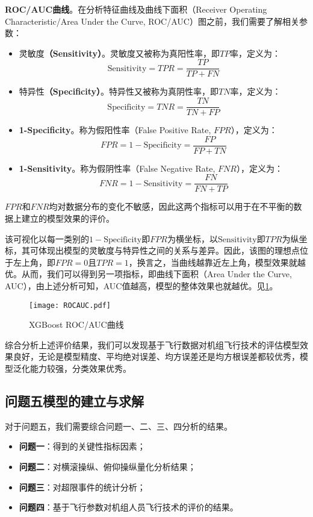 \documentclass{MathorCupModeling}
\begin{document}
\textbf{ROC/AUC曲线}。在分析特征曲线及曲线下面积（Receiver Operating Characteristic/Area Under the Curve, ROC/AUC）图之前，我们需要了解相关参数：
		\begin{itemize}
			\item {\heiti 灵敏度}\textbf{（Sensitivity）}。灵敏度又被称为真阳性率，即$TP$率，定义为：
			\begin{equation}
				\mathrm{Sensitivity}=TPR=\frac{TP}{TP+FN} \label{Sensitivity}
			\end{equation}
			\item {\heiti 特异性}\textbf{（Specificity）}。特异性又被称为真阴性率，即$TN$率，定义为：
			\begin{equation}
				\mathrm{Specificity}=TNR=\frac{TN}{TN+FP} \label{Specificity}
			\end{equation}
			\item \textbf{1-Specificity}。称为假阳性率（False Positive Rate, $FPR$），定义为：
			\begin{equation}
				FPR=1-\mathrm{Specificity}=\frac{FP}{FP+TN} \label{FPR}
			\end{equation}
			\item \textbf{1-Sensitivity}。称为假阴性率（False Negative Rate, $FNR$），定义为：
			\begin{equation}
				FNR=1-\mathrm{Sensitivity}=\frac{FN}{FN+TP} \label{FNR}
			\end{equation}
		\end{itemize}
		$FPR$和$FNR$均对数据分布的变化不敏感\textcolor{blue}{\cite{Paper:ROCAUC}}，因此这两个指标可以用于在不平衡的数据上建立的模型效果的评价。
		
该可视化以每一类别的$1-\mathrm{Specificity}$即$FPR$为横坐标，以$\mathrm{Sensitivity}$即$TPR$为纵坐标，其可体现出模型的灵敏度与特异性之间的关系与差异。因此，该图的理想点位于左上角，即$FPR=0$且$TPR=1$，换言之，当曲线越靠近左上角，模型效果就越优。从而，我们可以得到另一项指标，即曲线下面积（Area Under the Curve, AUC），由上述分析可知，AUC值越高，模型的整体效果也就越优。见\textcolor{blue}{\cref{fig:ROCAUC}}。
		\begin{figure}[H]
			\centering
			\texttt{[image: ROCAUC.pdf]}
			\caption{XGBoost ROC/AUC曲线}
			\label{fig:ROCAUC}
		\end{figure}

综合分析上述评价结果，我们可以发现基于飞行数据对机组飞行技术的评估模型效果良好，无论是模型精度、平均绝对误差、均方误差还是均方根误差都较优秀，模型泛化能力较强，分类效果优秀。
  
	\subsection{问题五模型的建立与求解}
对于问题五，我们需要综合问题一、二、三、四分析的结果。
\begin{itemize}
	\item \textbf{问题一}：得到的关键性指标因素；
	\item \textbf{问题二}：对横滚操纵、俯仰操纵量化分析结果；
	\item \textbf{问题三}：对超限事件的统计分析；
	\item \textbf{问题四}：基于飞行参数对机组人员飞行技术的评价的结果。
\end{itemize}
\end{document}
